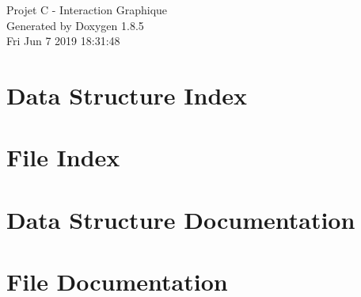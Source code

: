 \documentclass[twoside]{book}
\newcommand{\clearemptydoublepage}{%
  \newpage{\pagestyle{empty}\cleardoublepage}%
}
\begin{document}
\hypersetup{pageanchor=false}
\begin{titlepage}
\vspace*{7cm}
\begin{center}%
{\Large Projet C -\/ Interaction Graphique }\\
\vspace*{1cm}
{\large Generated by Doxygen 1.8.5}\\
\vspace*{0.5cm}
{\small Fri Jun 7 2019 18:31:48}\\
\end{center}
\end{titlepage}
\clearemptydoublepage
\tableofcontents
\clearemptydoublepage
{}
\hypersetup{pageanchor=true}

\chapter{Data Structure Index}

\chapter{File Index}

\chapter{Data Structure Documentation}




















\chapter{File Documentation}



























\newpage
{}
{}
\printindex
\end{document}
